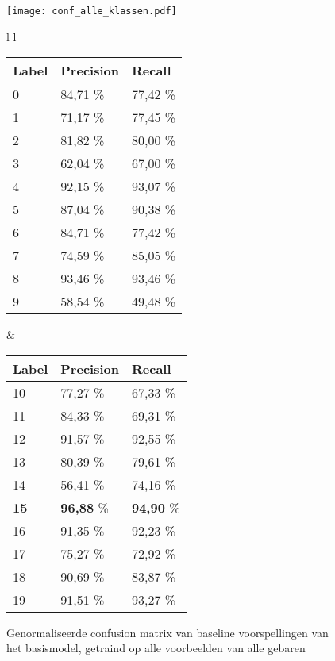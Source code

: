 \begin{figure}
	\centering
	
	\texttt{[image: conf\_alle\_klassen.pdf]}
	\caption{Genormaliseerde confusion matrix van baseline voorspellingen van het basismodel, getraind op alle voorbeelden van alle gebaren }
	\label{fig:conf-allegebaren}

	\vspace{1cm}
	\begin{tabular}{l l}
		\begin{tabular}{l l l}
			\hline
			\textbf{Label} & \textbf{Precision} &
			\textbf{Recall}\\
			\hline
			0 & 84,71 \% & 77,42 \% \\
			1 & 71,17 \% & 77,45 \% \\
			2 & 81,82 \% & 80,00 \% \\
			3 & 62,04 \% & 67,00 \% \\
			4 & 92,15 \% & 93,07 \% \\
			5 & 87,04 \% & 90,38 \% \\
			6 & 84,71 \% & 77,42 \% \\
			7 & 74,59 \% & 85,05 \% \\
			8 & 93,46 \% & 93,46 \% \\
			9 & 58,54 \% & 49,48 \% \\
			\hline
		\end{tabular} & 
		\begin{tabular}{l l l}
			\hline
			\textbf{Label} & \textbf{Precision} &
			\textbf{Recall}\\
			\hline
			10 & 77,27 \% & 67,33 \% \\
			11 & 84,33 \% & 69,31 \% \\
			12 & 91,57 \% & 92,55 \% \\
			13 & 80,39 \% & 79,61 \% \\
			14 & 56,41 \% & 74,16 \% \\
			\textbf{15} & \textbf{96,88} \% & \textbf{94,90} \% \\
			16 & 91,35 \% & 92,23 \% \\
			17 & 75,27 \% & 72,92 \% \\
			18 & 90,69 \% & 83,87 \% \\
			19 & 91,51 \% & 93,27 \% \\
			\hline
		\end{tabular}	
	\end{tabular}
	\label{tab:pr-alle-klassen}


\end{figure}


